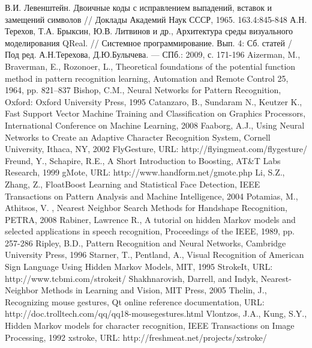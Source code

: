 \documentclass[a5paper]{article}
\begin{document}
\pagebreak

\begin{thebibliography}{9001}
   В.И. Левенштейн. Двоичные коды с исправлением выпадений, вставок и замещений символов // Доклады Академий Наук СССР, 1965. 163.4:845-848
   А.Н. Терехов, Т.А. Брыксин, Ю.В. Литвинов и др., Архитектура среды визуального моделирования QReal. // Системное 
программирование. Вып. 4: Сб. статей / Под ред. А.Н.Терехова, Д.Ю.Булычева. --- СПб.: 2009, с. 171-196
   Aizerman, M., Braverman, E., Rozonoer, L., Theoretical foundations of the potential function method in pattern recognition learning, 
Automation and Remote Control 25, 1964, pp. 821–837
   Bishop, C.M., Neural Networks for Pattern Recognition, Oxford: Oxford University Press, 1995  
   Catanzaro, B., Sundaram N., Keutzer K., Fast Support Vector Machine Training and Classification on Graphics Processors, International 
Conference on Machine Learning, 2008
   Faaborg, A.J., Using Neural Networks to Create an Adaptive Character Recognition System, Cornell University, Ithaca, NY, 2002
   FlyGesture, URL: http://flyingmeat.com/flygesture/
   Freund, Y., Schapire, R.E., A Short Introduction to Boosting, AT\&T Labs Research, 1999
   gMote, URL: http://www.handform.net/gmote.php
   Li, S.Z., Zhang, Z., FloatBoost Learning and Statistical Face Detection, IEEE Transactions on Pattern Analysis and Machine Intelligence, 2004
   Potamias, M., Athitsos, V. , Nearest Neighbor Search Methods for Handshape Recognition, PETRA, 2008
   Rabiner, Lawrence R., A tutorial on hidden Markov models and selected applications in speech recognition, Proceedings of the IEEE, 1989, pp. 257-286
   Ripley, B.D., Pattern Recognition and Neural Networks, Cambridge University Press, 1996
   Starner, T., Pentland, A., Visual Recognition of American Sign Language Using Hidden Markov Models, MIT, 1995
   StrokeIt, URL: http://www.tcbmi.com/strokeit/  
   Shakhnarovish, Darrell, and Indyk, Nearest-Neighbor Methods in Learning and Vision, MIT Press, 2005
   Thelin, J., Recognizing mouse gestures, Qt online reference documentation, URL: http://doc.trolltech.com/qq/qq18-mousegestures.html 
   Vlontzos, J.A., Kung, S.Y., Hidden Markov models for character recognition, IEEE Transactions on Image Processing, 1992
   xstroke, URL: http://freshmeat.net/projects/xstroke/
\end{thebibliography}
  
\end{document}
